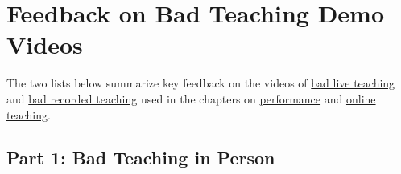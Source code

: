 \documentclass[10pt,statementpaper]{memoir}
\begin{document}
\section{Feedback on Bad Teaching Demo
Videos}\label{feedback-on-bad-teaching-demo-videos}

The two lists below summarize key feedback on the videos of
\href{biblio.html\#wilson-bad-teaching-live}{bad live teaching} and
\href{biblio.html\#wilson-bad-teaching-recorded}{bad recorded teaching}
used in the chapters on \href{performance.html}{performance} and
\href{online.html}{online teaching}.

\subsection{Part 1: Bad Teaching in
Person}\label{part-1-bad-teaching-in-person}
\end{document}
